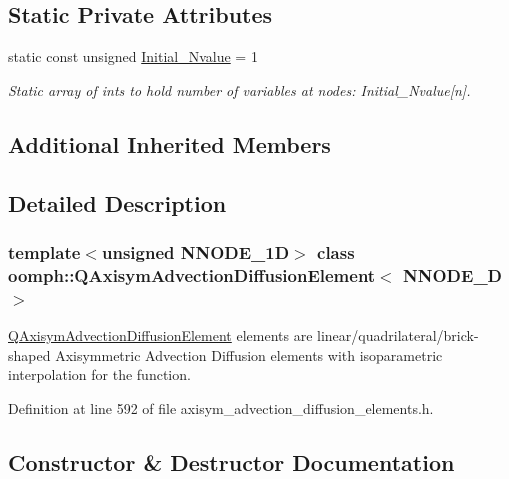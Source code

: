 \subsection*{Static Private Attributes}
\begin{DoxyCompactItemize}
\item 
static const unsigned \hyperlink{classoomph_1_1QAxisymAdvectionDiffusionElement_a2d3204e595a313a63345986196137aac}{Initial\+\_\+\+Nvalue} = 1
\begin{DoxyCompactList}\small\item\em Static array of ints to hold number of variables at nodes\+: Initial\+\_\+\+Nvalue\mbox{[}n\mbox{]}. \end{DoxyCompactList}\end{DoxyCompactItemize}
\subsection*{Additional Inherited Members}


\subsection{Detailed Description}
\subsubsection*{template$<$unsigned N\+N\+O\+D\+E\+\_\+1D$>$\newline
class oomph\+::\+Q\+Axisym\+Advection\+Diffusion\+Element$<$ N\+N\+O\+D\+E\+\_\+D $>$}

\hyperlink{classoomph_1_1QAxisymAdvectionDiffusionElement}{Q\+Axisym\+Advection\+Diffusion\+Element} elements are linear/quadrilateral/brick-\/shaped Axisymmetric Advection Diffusion elements with isoparametric interpolation for the function. 

Definition at line 592 of file axisym\+\_\+advection\+\_\+diffusion\+\_\+elements.\+h.



\subsection{Constructor \& Destructor Documentation}
\mbox{\label{classoomph_1_1QAxisymAdvectionDiffusionElement_a183735ff0dce27e2bc0343f8cb3bbea0}} 
